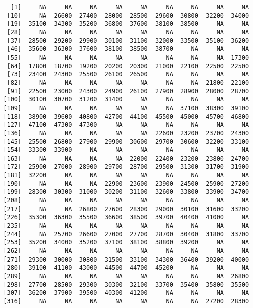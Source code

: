 \documentclass[]{article}
\begin{document}
\begin{verbatim}
    [1]     NA     NA     NA     NA     NA     NA     NA     NA     NA
   [10]     NA  26600  27400  28000  28500  29600  30800  32200  34000
   [19]  35100  34300  35200  36800  37600  38100  38500     NA     NA
   [28]     NA     NA     NA     NA     NA     NA     NA     NA     NA
   [37]  28500  29200  29900  30100  31100  32000  33500  35100  36200
   [46]  35600  36300  37600  38100  38500  38700     NA     NA     NA
   [55]     NA     NA     NA     NA     NA     NA     NA     NA  17300
   [64]  17800  18700  19200  20200  20300  21000  22100  22500  22500
   [73]  23400  24300  25500  26100  26500     NA     NA     NA     NA
   [82]     NA     NA     NA     NA     NA     NA     NA  21800  22100
   [91]  22500  23000  24300  24900  26100  27900  28900  28000  28700
  [100]  30100  30700  31200  31400     NA     NA     NA     NA     NA
  [109]     NA     NA     NA     NA     NA     NA  37100  38300  39100
  [118]  38900  39600  40800  42700  44100  45500  45000  45700  46800
  [127]  47100  47300  47300     NA     NA     NA     NA     NA     NA
  [136]     NA     NA     NA     NA     NA  22600  23200  23700  24300
  [145]  25500  26800  27900  29900  30600  29700  30600  32200  33100
  [154]  33300  33900     NA     NA     NA     NA     NA     NA     NA
  [163]     NA     NA     NA     NA  22000  22400  23200  23800  24700
  [172]  25900  27000  28900  29700  28700  29500  31300  31700  31900
  [181]  32200     NA     NA     NA     NA     NA     NA     NA     NA
  [190]     NA     NA     NA  22900  23600  23900  24500  25900  27200
  [199]  28300  30300  31000  30200  31100  32600  33800  33900  34700
  [208]     NA     NA     NA     NA     NA     NA     NA     NA     NA
  [217]     NA     NA  26800  27600  28300  29000  30100  31600  33200
  [226]  35300  36300  35500  36600  38500  39700  40400  41000     NA
  [235]     NA     NA     NA     NA     NA     NA     NA     NA     NA
  [244]     NA  25700  26600  27000  27700  28700  30400  31800  33700
  [253]  35200  34000  35200  37100  38100  38800  39200     NA     NA
  [262]     NA     NA     NA     NA     NA     NA     NA     NA     NA
  [271]  29300  30000  30800  31500  33100  34300  36400  39200  40000
  [280]  39100  41100  43000  44500  44700  45200     NA     NA     NA
  [289]     NA     NA     NA     NA     NA     NA     NA     NA  26800
  [298]  27700  28500  29300  30300  32100  33700  35400  35800  35500
  [307]  36200  37900  39500  40300  41200     NA     NA     NA     NA
  [316]     NA     NA     NA     NA     NA     NA     NA  27200  28300

\end{verbatim}
\end{document}
